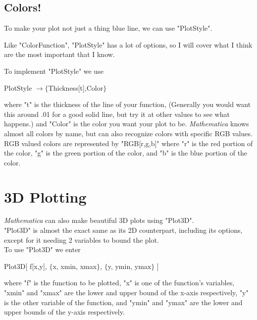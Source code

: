\documentclass[11pt,letterpaper,twoside,titlepage]{report}
\newcommand{\Mathematica}{\textit{Mathematica} }
\begin{document}
				\subsection{Colors!}
						
					To make your plot not just a thing blue line, we can use "PlotStyle".
						
					Like "ColorFunction", "PlotStyle" has a lot of options, so I will cover what I think are the most important that I know.
						
					To implement "PlotStyle" we use
						
					\begin{center} PlotStyle $ \rightarrow \{ $Thickness[t],Color$ \} $ \end{center}
						
					where "t" is the thickness of the line of your function, (Generally you would want this around .01 for a good solid line, but try it at other values to see what happens.) and "Color" is the color you want your plot to be.  \Mathematica knows almost all colors by name, but can also recognize colors with specific RGB values.  RGB valued colors are represented by "RGB[r,g,b]" where "r" is the red portion of the color, "g" is the green portion of the color, and "b" is the blue portion of the color.
				
			\section{3D Plotting}
			
				\Mathematica can also make beautiful 3D plots using "Plot3D". \\
				
				"Plot3D" is almost the exact same as its 2D counterpart, including its options, except for it needing 2 variables to bound the plot. \\
				
				To use "Plot3D" we enter
				
				\begin{center}
				
					Plot3D[ f[x,y], $\{$x, xmin, xmax$\}$, $\{$y, ymin, ymax$\}$ ]
				
				\end{center}
				
				where "f" is the function to be plotted, "x" is one of the function's variables, "xmin" and "xmax" are the lower and upper bound of the x-axis respectively, "y" is the other variable of the function, and "ymin" and "ymax" are the lower and upper bounds of the y-axis respectively.
		
\end{document}
